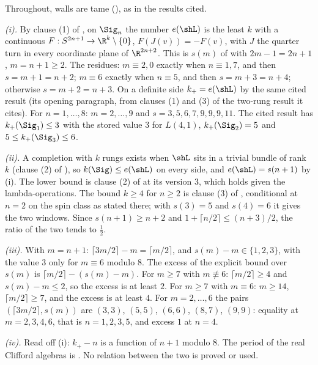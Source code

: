 Throughout, walls are tame (), as in the results cited.

\emph{(i).} By clause (1) of , on $\Sig_{n}$ the number $e(\shL)$ is the least $k$ with a continuous $F : S^{2n+1} \to \R^{k} \setminus \{0\}$, $F(J(v)) = -F(v)$, with $J$ the quarter turn in every coordinate plane of $\R^{2n+2}$. This is $s(m)$ of  with $2m - 1 = 2n + 1$, $m = n + 1 \ge 2$. The residues: $m \equiv 2, 0$ exactly when $n \equiv 1, 7$, and then $s = m + 1 = n + 2$; $m \equiv 6$ exactly when $n \equiv 5$, and then $s = m + 3 = n + 4$; otherwise $s = m + 2 = n + 3$. On a definite side $k_{+} = e(\shL)$ by the same cited result (its opening paragraph, from clauses (1) and (3) of the two-rung result it cites). For $n = 1, \dots, 8$: $m = 2, \dots, 9$ and $s = 3, 5, 6, 7, 9, 9, 9, 11$. The cited result has $k_{+}(\Sig_{1}) \le 3$ with the stored value $3$ for $L(4,1)$, $k_{+}(\Sig_{2}) = 5$ and $5 \le k_{+}(\Sig_{3}) \le 6$.

\emph{(ii).} A completion with $k$ rungs exists when $\shL$ sits in a trivial bundle of rank $k$ (clause (2) of ), so $k(\Sig) \le e(\shL)$ on every side, and $e(\shL) = s(n+1)$ by (i). The lower bound is clause (2) of  at its version 3, which holds given the lambda-operations. The bound $k \ge 4$ for $n \ge 2$ is clause (3) of , conditional at $n = 2$ on the spin class as stated there; with $s(3) = 5$ and $s(4) = 6$ it gives the two windows. Since $s(n+1) \ge n + 2$ and $1 + \lceil n/2 \rceil \le (n + 3)/2$, the ratio of the two tends to $\tfrac12$.

\emph{(iii).} With $m = n + 1$: $\lceil 3m/2 \rceil - m = \lceil m/2 \rceil$, and $s(m) - m \in \{1, 2, 3\}$, with the value $3$ only for $m \equiv 6$ modulo $8$. The excess of the explicit bound over $s(m)$ is $\lceil m/2 \rceil - (s(m) - m)$. For $m \ge 7$ with $m \not\equiv 6$: $\lceil m/2 \rceil \ge 4$ and $s(m) - m \le 2$, so the excess is at least $2$. For $m \ge 7$ with $m \equiv 6$: $m \ge 14$, $\lceil m/2 \rceil \ge 7$, and the excess is at least $4$. For $m = 2, \dots, 6$ the pairs $(\lceil 3m/2 \rceil, s(m))$ are $(3,3)$, $(5,5)$, $(6,6)$, $(8,7)$, $(9,9)$: equality at $m = 2, 3, 4, 6$, that is $n = 1, 2, 3, 5$, and excess $1$ at $n = 4$.

\emph{(iv).} Read off (i): $k_{+} - n$ is a function of $n + 1$ modulo $8$. The period of the real Clifford algebras is . No relation between the two is proved or used.
